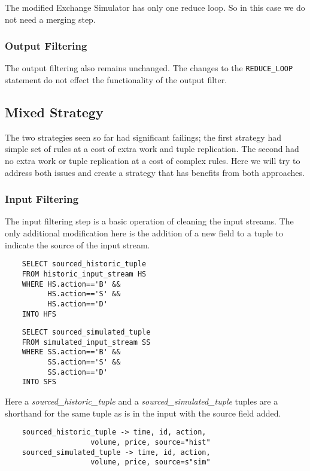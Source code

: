 \documentclass{article}
\begin{document}
The modified Exchange Simulator has only one reduce loop. So in this case we do not need a merging step.

\subsubsection{Output Filtering}

The output filtering also remains unchanged. The changes to the {\tt REDUCE\_LOOP} statement do not effect the functionality of the output filter.  


\subsection{Mixed Strategy}

The two strategies seen so far had significant failings; the first strategy had simple set of rules at a cost of extra work and tuple replication. The second had no extra work or tuple replication at a cost of complex rules. Here we will try to address both issues and create a strategy that has benefits from both approaches. 

\subsubsection{Input Filtering}

The input filtering step is a basic operation of cleaning the input streams. The only additional modification here is the addition of a new field to a tuple to indicate the source of the input stream. 

\begin{verbatim}   
    SELECT sourced_historic_tuple 
    FROM historic_input_stream HS
    WHERE HS.action=='B' &&
          HS.action=='S' &&
          HS.action=='D'
    INTO HFS
\end{verbatim}

\begin{verbatim}  
    SELECT sourced_simulated_tuple
    FROM simulated_input_stream SS
    WHERE SS.action=='B' &&
          SS.action=='S' &&
          SS.action=='D'
    INTO SFS
\end{verbatim}

\noindent Here a \emph{sourced\_historic\_tuple} and a \emph{sourced\_simulated\_tuple} tuples are a shorthand for the same tuple as is in the input with the source field added. 

\begin{verbatim}
    sourced_historic_tuple -> time, id, action, 
                    volume, price, source="hist"
    sourced_simulated_tuple -> time, id, action, 
                    volume, price, source=s"sim"
\end{verbatim}
\end{document}
